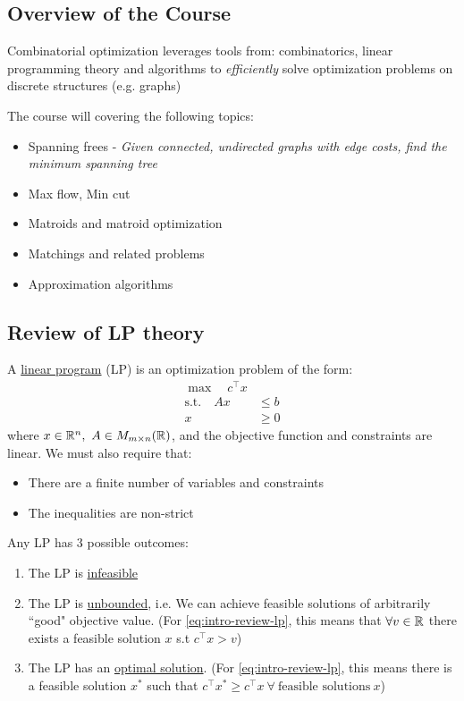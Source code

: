 \documentclass[../main.tex]{subfiles}
\begin{document}
\subsection{Overview of the Course}
Combinatorial optimization leverages tools from: combinatorics, linear programming theory and algorithms to \textit{efficiently} solve optimization problems on discrete structures (e.g. graphs)

The course will covering the following topics:
\begin{itemize}
    \item Spanning frees - \textit{Given connected, undirected graphs with edge costs, find the minimum spanning tree}
    \item Max flow, Min cut
    \item Matroids and matroid optimization
    \item Matchings and related problems
    \item Approximation algorithms
\end{itemize}

\subsection{Review of LP theory}
A \underline{linear program} (LP) is an optimization problem of the form:
\begin{equation}\label{eq:intro-review-lp}
\begin{aligned}
    \max \quad c^\intercal x & \\
    \text{s.t.} \quad Ax &\leq b \\
    x &\geq 0
\end{aligned}
\end{equation}
where $x \in \mathbb{R}^n, \ A \in M_{m \times n}(\mathbb{R}) $, and the objective function and constraints are linear. We must also require that:
\begin{itemize}
    \item There are a finite number of variables and constraints
    \item The inequalities are non-strict
\end{itemize}

Any LP has 3 possible outcomes:
\begin{enumerate}
    \item The LP is \underline{infeasible}
    \item The LP is \underline{unbounded}, i.e. We can achieve feasible solutions of arbitrarily ``good" objective value. (For \eqref{eq:intro-review-lp}, this means that $\forall v \in \mathbb{R}$ there exists a feasible solution $x$ s.t $c^\intercal x > v$)
    \item The LP has an \underline{optimal solution}. (For \eqref{eq:intro-review-lp}, this means there is a feasible solution $x^*$ such that $c^\intercal x^* \geq c^\intercal x \ \forall \ \text{feasible solutions} \ x$)
\end{enumerate}
\end{document}
